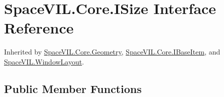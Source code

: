 \hypertarget{interface_space_v_i_l_1_1_core_1_1_i_size}{}\section{Space\+V\+I\+L.\+Core.\+I\+Size Interface Reference}
\label{interface_space_v_i_l_1_1_core_1_1_i_size}


Inherited by \mbox{\hyperlink{class_space_v_i_l_1_1_core_1_1_geometry}{Space\+V\+I\+L.\+Core.\+Geometry}}, \mbox{\hyperlink{interface_space_v_i_l_1_1_core_1_1_i_base_item}{Space\+V\+I\+L.\+Core.\+I\+Base\+Item}}, and \mbox{\hyperlink{class_space_v_i_l_1_1_window_layout}{Space\+V\+I\+L.\+Window\+Layout}}.

\subsection*{Public Member Functions}

